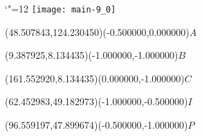 \documentclass[12pt]{article}
\begin{document}
\makeatletter%
\let\ASYencoding\f@encoding%
\let\ASYfamily\f@family%
\let\ASYseries\f@series%
\let\ASYshape\f@shape%
\makeatother%
{\catcode`"=12%
\texttt{[image: main-9\_0]}%
}%
\kern -170.716535pt%
%
%
\fontsize{10.000000}{12.000000}\selectfont%
\usefont{\ASYencoding}{\ASYfamily}{\ASYseries}{\ASYshape}%
\ASYalign(48.507843,124.230450)(-0.500000,0.000000){$A$}%
%
%
\fontsize{10.000000}{12.000000}\selectfont%
\ASYalign(9.387925,8.134435)(-1.000000,-1.000000){$B$}%
%
%
\fontsize{10.000000}{12.000000}\selectfont%
\ASYalign(161.552920,8.134435)(0.000000,-1.000000){$C$}%
%
%
\fontsize{10.000000}{12.000000}\selectfont%
\ASYalign(62.452983,49.182973)(-1.000000,-0.500000){$I$}%
%
%
\fontsize{10.000000}{12.000000}\selectfont%
\ASYalign(96.559197,47.899674)(-0.500000,-1.000000){$P$}%
\end{document}
